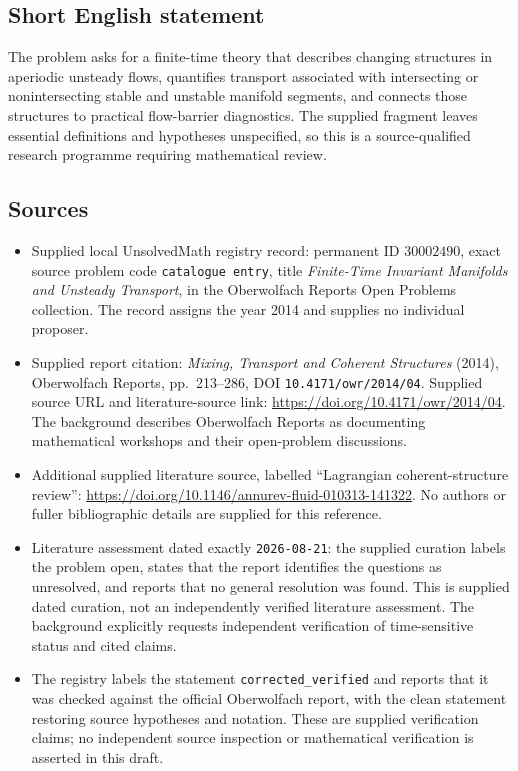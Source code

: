 \documentclass[11pt]{article}
\begin{document}
\subsection{Short English statement}
The problem asks for a finite-time theory that describes changing structures in aperiodic unsteady flows, quantifies transport associated with intersecting or nonintersecting stable and unstable manifold segments, and connects those structures to practical flow-barrier diagnostics. The supplied fragment leaves essential definitions and hypotheses unspecified, so this is a source-qualified research programme requiring mathematical review.
\subsection{Sources}
\begin{itemize}
\item Supplied local UnsolvedMath registry record: permanent ID \(30002490\), exact source problem code \texttt{catalogue entry}, title \emph{Finite-Time Invariant Manifolds and Unsteady Transport}, in the Oberwolfach Reports Open Problems collection. The record assigns the year 2014 and supplies no individual proposer.
\item Supplied report citation: \emph{Mixing, Transport and Coherent Structures} (2014), Oberwolfach Reports, pp.\ 213--286, DOI \texttt{10.4171/owr/2014/04}. Supplied source URL and literature-source link: \url{https://doi.org/10.4171/owr/2014/04}. The background describes Oberwolfach Reports as documenting mathematical workshops and their open-problem discussions.
\item Additional supplied literature source, labelled ``Lagrangian coherent-structure review'': \url{https://doi.org/10.1146/annurev-fluid-010313-141322}. No authors or fuller bibliographic details are supplied for this reference.
\item Literature assessment dated exactly \texttt{2026-08-21}: the supplied curation labels the problem open, states that the report identifies the questions as unresolved, and reports that no general resolution was found. This is supplied dated curation, not an independently verified literature assessment. The background explicitly requests independent verification of time-sensitive status and cited claims.
\item The registry labels the statement \texttt{corrected\_verified} and reports that it was checked against the official Oberwolfach report, with the clean statement restoring source hypotheses and notation. These are supplied verification claims; no independent source inspection or mathematical verification is asserted in this draft.
\end{itemize}
\end{document}
